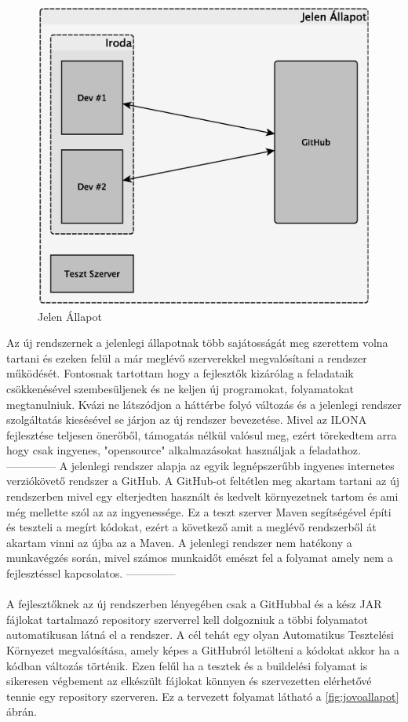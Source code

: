 \begin{figure}[h]
	\centering
	\includegraphics[width=0.7\linewidth]{figures/jelenallapot}
	\caption{Jelen Állapot}
	\label{fig:jelenallapot}
\end{figure}

Az új rendszernek a jelenlegi állapotnak több sajátosságát meg szerettem volna tartani és ezeken felül a már meglévő szerverekkel megvalósítani a rendszer működését. 
Fontosnak tartottam hogy a fejlesztők kizárólag a feladataik csökkenésével szembesüljenek és ne keljen új programokat, folyamatokat megtanulniuk. 
Kvázi ne látszódjon a háttérbe folyó változás és a jelenlegi rendszer szolgáltatás kiesésével se járjon az új rendszer bevezetése. 
Mivel az ILONA fejlesztése teljesen önerőből, támogatás nélkül valósul meg, ezért törekedtem arra hogy csak ingyenes, "opensource" alkalmazásokat használjak a feladathoz. 
--------------
A jelenlegi rendszer alapja az egyik legnépszerűbb ingyenes internetes verziókövető rendszer a GitHub. 
A GitHub-ot feltétlen meg akartam tartani az új rendszerben mivel egy elterjedten használt és kedvelt környezetnek tartom és ami még mellette szól az az ingyenessége. 
Ez a teszt szerver Maven segítségével építi és teszteli a megírt kódokat, ezért a következő amit a meglévő rendszerből át akartam vinni az újba az a Maven. 
A jelenlegi rendszer nem hatékony a munkavégzés során, mivel számos munkaidőt emészt fel a folyamat amely nem a fejlesztéssel kapcsolatos. 
--------------
\pagebreak
\paragraph{}
A fejlesztőknek az új rendszerben lényegében csak a GitHubbal és a kész JAR fájlokat tartalmazó repository szerverrel kell dolgozniuk a többi folyamatot automatikusan látná el a rendszer. 
A cél tehát egy olyan Automatikus Tesztelési Környezet megvalósítása, amely képes a GitHubról letölteni a kódokat akkor ha a kódban változás történik. 
Ezen felűl ha a tesztek és a buildelési folyamat is sikeresen végbement az elkészült fájlokat könnyen és szervezetten elérhetővé tennie egy repository szerveren. 
Ez a tervezett folyamat látható a \ref{fig:jovoallapot} ábrán. 


